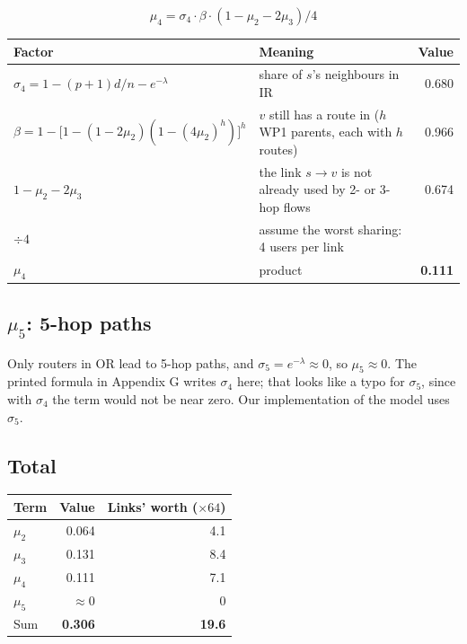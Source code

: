 \documentclass[11pt]{article}
\begin{document}
\[
\mu_4 = \sigma_4 \cdot \beta \cdot (1 - \mu_2 - 2\mu_3) / 4
\]

\begin{center}
\begin{tabularx}{\linewidth}{@{}l L r@{}}
\toprule
Factor & Meaning & Value \\
\midrule
$\sigma_4 = 1 - (p+1)d/n - e^{-\lambda}$ & share of $s$'s neighbours in IR & 0.680 \\
$\beta = 1 - \big[1 - (1 - 2\mu_2)(1 - (4\mu_2)^h)\big]^h$ & $v$ still has a route in ($h$ WP1 parents, each with $h$ routes) & 0.966 \\
$1 - \mu_2 - 2\mu_3$ & the link $s \to v$ is not already used by 2- or 3-hop flows & 0.674 \\
$\div 4$ & assume the worst sharing: 4 users per link & \\
$\mu_4$ & product & \textbf{0.111} \\
\bottomrule
\end{tabularx}
\end{center}

\subsection*{$\mu_5$: 5-hop paths}

Only routers in OR lead to 5-hop paths, and $\sigma_5 = e^{-\lambda} \approx 0$, so $\mu_5 \approx 0$. The printed formula in Appendix G writes $\sigma_4$ here; that looks like a typo for $\sigma_5$, since with $\sigma_4$ the term would not be near zero. Our implementation of the model uses $\sigma_5$.

\subsection*{Total}

\begin{center}
\begin{tabular}{@{}lrr@{}}
\toprule
Term & Value & Links' worth ($\times 64$) \\
\midrule
$\mu_2$ & 0.064 & 4.1 \\
$\mu_3$ & 0.131 & 8.4 \\
$\mu_4$ & 0.111 & 7.1 \\
$\mu_5$ & $\approx 0$ & 0 \\
\midrule
Sum & \textbf{0.306} & \textbf{19.6} \\
\bottomrule
\end{tabular}
\end{center}
\end{document}

